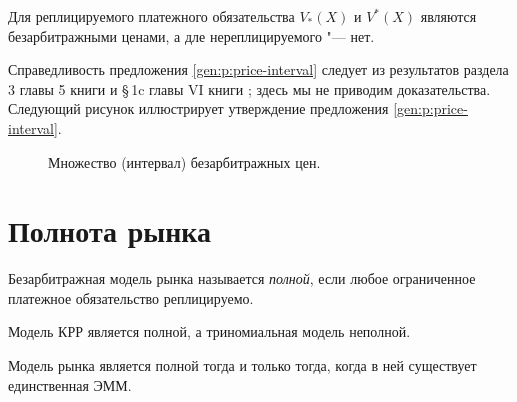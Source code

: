 \begin{remark}
Для реплицируемого платежного обязательства $V_*(X)$ и $V^*(X)$ являются безарбитражными ценами, а дле нереплицируемого "--- нет.
\end{remark}

Справедливость предложения \ref{gen:p:price-interval} следует из результатов раздела 3 главы 5 книги \cite{FollmerSchied11} и \S\,1c главы VI книги \cite{Shiryaev98}; здесь мы не приводим доказательства.
Следующий рисунок иллюстрирует утверждение предложения \ref{gen:p:price-interval}.

\begin{figure}[h]
\centering
{}
\caption{Множество (интервал) безарбитражных цен.}
\label{gen:fig:na-interval}
\end{figure}


\section{Полнота рынка}

\begin{definition}
Безарбитражная модель рынка называется \emph{полной}, если любое ограниченное платежное обязательство реплицируемо.
\end{definition}

\begin{example}
Модель КРР является полной, а триномиальная модель неполной.
\end{example}

\begin{theorem}
Модель рынка является полной тогда и только тогда, когда в ней существует единственная ЭММ.
\end{theorem}

